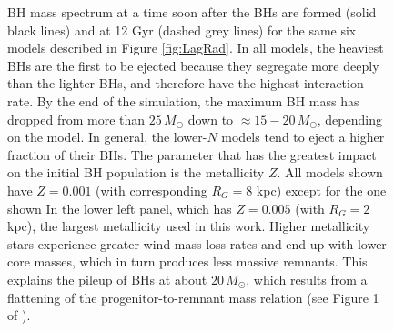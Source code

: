 \documentclass[12pt,preprint]{aastex}
\begin{document}
\begin{figure}[!ht]


	\caption{BH mass spectrum at a time soon after the BHs are formed (solid black lines) 
	and at 12 Gyr (dashed grey lines) for the same six models described in Figure \ref{fig:LagRad}.
 	In all models, the heaviest BHs are the first to be ejected because they segregate more deeply 
	than the lighter BHs, and therefore have the highest interaction rate. By the end of the simulation,
  	the maximum BH mass has dropped from more than $25\,M_\odot$ down to $\approx 15-20\,M_\odot$, 
	depending on the model. In general, the lower-$N$ models tend to eject a higher fraction of 
	their BHs. The parameter that has the greatest impact on the initial BH population is the metallicity $Z$.
	All models shown have $Z=0.001$ (with corresponding $R_G=8$ kpc) except for the one shown
	In the lower left panel, which has $Z=0.005$ (with $R_G=2$ kpc), the largest metallicity used in this work. Higher metallicity
	stars experience greater wind mass loss rates and end up with lower core masses, which in turn
	produces less massive remnants. This explains the pileup of BHs at about $20\,M_\odot$, which results
	from a flattening of the progenitor-to-remnant mass relation (see Figure 1 of \cite{Belczynski2004}).
	}
	\label{fig:BHmasses}
\end{figure}



\end{document}

